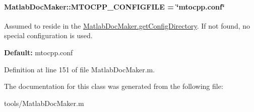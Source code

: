 \paragraph[{M\+T\+O\+C\+P\+P\+\_\+\+C\+O\+N\+F\+I\+G\+F\+I\+L\+E}]{\setlength{\rightskip}{0pt plus 5cm}Matlab\+Doc\+Maker\+::\+M\+T\+O\+C\+P\+P\+\_\+\+C\+O\+N\+F\+I\+G\+F\+I\+L\+E = \char`\"{}mtocpp.\+conf\char`\"{}\hspace{0.3cm}{\ttfamily [static]}}\label{class_matlab_doc_maker_ab61ab79ccd92642c4fef74c6abbee559}
Assumed to reside in the \hyperlink{class_matlab_doc_maker_a11a2a8ec616df969a911b325e39b0b4f}{Matlab\+Doc\+Maker.\+get\+Config\+Directory}. If not found, no special configuration is used.

{\bfseries Default\+:} {\ttfamily mtocpp.\+conf} 

Definition at line 151 of file Matlab\+Doc\+Maker.\+m.



The documentation for this class was generated from the following file\+:\begin{DoxyCompactItemize}
\item 
tools/Matlab\+Doc\+Maker.\+m\end{DoxyCompactItemize}
